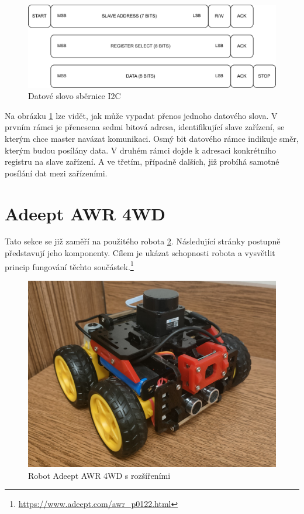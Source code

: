 \begin{figure}[h!]
	\centering
	\includegraphics[scale=0.75]{obrazky-figures/i2c_data_word.pdf}
	\caption{Datové slovo sběrnice I2C}
	\label{fig:i2c_word}
\end{figure}

Na obrázku \ref{fig:i2c_word} lze vidět, jak může vypadat přenos jednoho datového slova. V prvním rámci je přenesena sedmi bitová adresa, identifikující slave zařízení, se kterým chce master navázat komunikaci. Osmý bit datového rámce indikuje směr, kterým budou posílány data. V druhém rámci dojde k adresaci konkrétního registru na slave zařízení. A ve třetím, případně dalších, již probíhá samotné posílání dat mezi zařízeními. \cite[str:~88]{embeded_robotics}

\section{Adeept AWR 4WD}
Tato sekce se již zaměří na použitého robota \ref{fig:robot}. Následující stránky postupně představují jeho komponenty. Cílem je ukázat schopnosti robota a vysvětlit princip fungování těchto součástek.\footnote{\url{https://www.adeept.com/awr_p0122.html}}

\begin{figure}[h!]
	\centering
	\includegraphics[scale=0.2]{obrazky-figures/robot.jpg}
	\caption{Robot Adeept AWR 4WD s rozšířeními}
	\label{fig:robot}
\end{figure}

